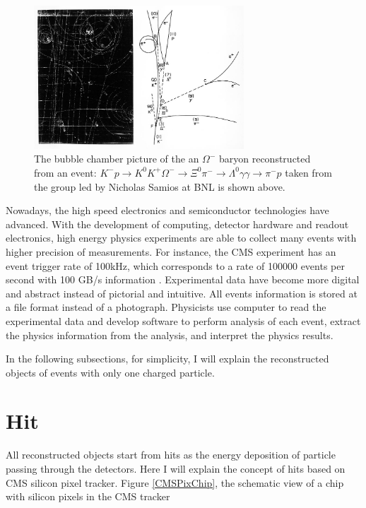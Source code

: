 \begin{figure}[hbtp]
\begin{center}
\includegraphics[width=0.70\textwidth]{Figures/Chapter4/Omega.jpg}
\caption{The bubble chamber picture of the an $\Omega^-$ baryon reconstructed from an event: $K^- p \rightarrow K^0 K^+ \Omega^- \rightarrow \Xi^0 \pi^- \rightarrow \Lambda^0 \gamma \gamma \rightarrow \pi^- p$ taken from the group led by Nicholas Samios at BNL is shown above.}
\label{OmegaNick}
\end{center}
\end{figure} 


Nowadays, the high speed electronics and semiconductor technologies have advanced. With the development of computing, detector hardware and readout electronics, high energy physics experiments are able to collect many events with higher precision of measurements. For instance, the CMS experiment has an event trigger rate of 100kHz, which corresponds to a rate of 100000 events per second with 100 GB/s information \cite{CMSDAQ}. Experimental data have become more digital and abstract instead of pictorial and intuitive. All events information is stored at a file format instead of a photograph. Physicists use computer to read the experimental data and develop software to perform analysis of each event, extract the physics information from the analysis, and interpret the physics results. 

In the following subsections, for simplicity, I will explain the reconstructed objects of events with only one charged particle. 

\section{Hit}

All reconstructed objects start from hits as the energy deposition of particle passing through the detectors. Here I will explain the concept of hits based on CMS silicon pixel tracker. Figure \ref{CMSPixChip}, the schematic view of a chip with silicon pixels in the CMS tracker


